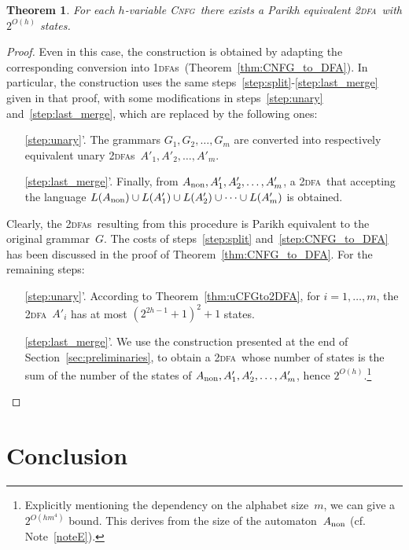 \documentclass[11pt]{article}
\newcommand*{\tw}{\textsc{2}}
\newcommand*{\twdfa}{\tw\textsc{dfa}}
\newcommand*{\twdfas}{\tw\textsc{dfa}s}
\newcommand*{\ow}{\textsc{1}}
\newcommand*{\owdfas}{\ow\textsc{dfa}s}
\newcommand*{\cnfg}{\textsc{Cnfg}}
\newtheorem{theorem}{Theorem}[section]
\begin{document}
\begin{theorem}\label{thm:CFGto2DFA}
  For each $h$-variable \cnfg\ there exists a Parikh equivalent \twdfa\ with $2^{O(h)}$ states.
\end{theorem}
\begin{proof}
  Even in this case, the construction is obtained by adapting the corresponding conversion
  into \owdfas\ (Theorem~\ref{thm:CNFG_to_DFA}).
  In particular, the construction uses the same steps~\ref{step:split}-\ref{step:last_merge} given
  in that proof, with some modifications in steps~\ref{step:unary} and~\ref{step:last_merge}, which are replaced
  by the following ones:
\begin{itemize}
  \item[\ref{step:unary}'.]
	The grammars $G_1, G_2, \ldots, G_m$ are converted into respectively equivalent unary \twdfas\ $A'_1, A'_2, \ldots, A'_m$.
\item[\ref{step:last_merge}'.]
	Finally, {}from $A_{\rm non}, A'_1, A'_2, \ldots, A'_m$, a \twdfa\ that accepting the language
	$L(A_{\rm non})\cup L(A'_1)\cup L(A'_2)\cup\cdots\cup L(A'_m)$ is obtained.
\end{itemize}
  Clearly, the \twdfas\ resulting from this procedure is Parikh equivalent to the original grammar~$G$.
  The costs of steps~\ref{step:split} and~\ref{step:CNFG_to_DFA} has been discussed in the proof
  of Theorem~\ref{thm:CNFG_to_DFA}. For the remaining steps:
\begin{itemize}
  \item[\ref{step:unary}'.]
	According to Theorem~\ref{thm:uCFGto2DFA}, for $i=1,\ldots,m$, the \twdfa~$A'_i$ has at most
	$(2^{2h-1}+1)^2+1$ states.
\item[\ref{step:last_merge}'.]
	We use the construction presented at the end of Section~\ref{sec:preliminaries}, to obtain a
	\twdfa\ whose number of states is the sum of the number of the states of $A_{\rm non}, A'_1, A'_2, \ldots, A'_m$,
	hence $2^{O(h)}$.\footnote{Explicitly mentioning the dependency on the alphabet size~$m$, we can give 
	a~$2^{O(hm^4)}$ bound. This derives from the size of the automaton~$A_{\rm non}$ (cf. Note~\ref{noteE}).
}
\qedhere
\end{itemize}
\end{proof}


\section{Conclusion}
	\label{sec:conclu}
\end{document}
